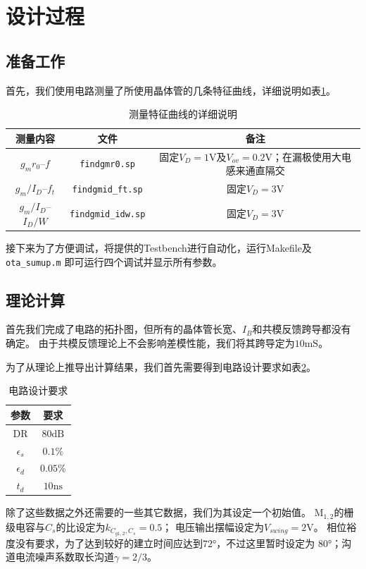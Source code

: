 \documentclass[a4paper]{article}
\newcommand{\uV}{\si{\volt}}
\newcommand{\uns}{\si{\nano\second}}
\newcommand{\umS}{\si{\milli\siemens}}
\newcommand{\udB}{\si{\deci\bel}}
\newcommand{\udeg}{\si{\degree}}
\newcommand{\dM}[1]{\mathrm{M}_\mathrm{#1}}
\newcommand{\DM}[1]{$\dM{#1}$}
\begin{document}
\section{设计过程}
\subsection{准备工作}
首先，我们使用电路测量了所使用晶体管的几条特征曲线，详细说明如表\ref{finds}。
\begin{table}
  \begin{center}
    \begin{tabular}{ccc}
      测量内容 & 文件 & 备注 \\\hline
      $g_mr_0$--$f$ & \texttt{findgmr0.sp} & 
            固定$V_D=1\uV$及$V_{ov}=0.2\uV$；在漏极使用大电感来通直隔交 \\
      $g_m/I_D$--$f_t$ & \texttt{findgmid\_ft.sp} &
            固定$V_D=3\uV$    \\
      $g_m/I_D$--$I_D/W$ & \texttt{findgmid\_idw.sp} &
            固定$V_D=3\uV$    
    \end{tabular}
  \end{center}
  \caption{测量特征曲线的详细说明}
  \label{finds}
\end{table}

接下来为了方便调试，将提供的Testbench进行自动化，运行Makefile及\texttt{ota\_sumup.m}
即可运行四个调试并显示所有参数。

\subsection{理论计算}
首先我们完成了电路的拓扑图，但所有的晶体管长宽、$I_B$和共模反馈跨导都没有确定。
由于共模反馈理论上不会影响差模性能，我们将其跨导定为$10\umS$。

为了从理论上推导出计算结果，我们首先需要得到电路设计要求如表\ref{requirements}。
\begin{table}
  \begin{center}
    \begin{tabular}{cc}
      参数 & 要求 \\\hline
      DR & $80\udB$ \\
      $\epsilon_s$ & $0.1\%$ \\
      $\epsilon_d$ & $0.05\%$ \\
      $t_d$ & $10\uns$ \\
    \end{tabular}
  \end{center}
  \caption{电路设计要求}
  \label{requirements}
\end{table}
除了这些数据之外还需要的一些其它数据，我们为其设定一个初始值。
\DM{1,2}的栅级电容与$C_s$的比设定为$k_{C_{g1,2},C_s}=0.5$；
电压输出摆幅设定为$V_{swing}=2\uV$。
相位裕度没有要求，为了达到较好的建立时间应达到$72\udeg$，不过这里暂时设定为
$80\udeg$；沟道电流噪声系数取长沟道$\gamma=2/3$。
\end{document}
